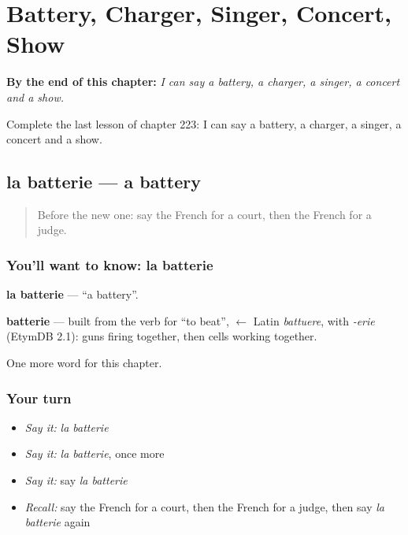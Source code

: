 
\chapter{Battery, Charger, Singer, Concert, Show}
\label{ch:fr-battery-charger-singer-concert-show}

\begin{chapteropening}
\textbf{By the end of this chapter:} \emph{I can say a battery, a charger, a singer, a concert and a show.}

Complete the last lesson of chapter 223: I can say a battery, a charger, a singer, a concert and a show.
\end{chapteropening}

\section[la batterie]{la batterie — a battery}

\label{lesson:FR-C223-batterie}



\begin{quote}
Before the new one: say the French for a court, then the French for a judge.
\end{quote}

\subsection*{You'll want to know: la batterie}
\textbf{la batterie} — \textquotedblleft{}a battery\textquotedblright{}.

\begin{cousinweb}
\textbf{batterie} — built from the verb for \textquotedblleft{}to beat\textquotedblright{}, $\leftarrow$ Latin \emph{battuere}, with \emph{-erie} (EtymDB 2.1): guns firing together, then cells working together.
\end{cousinweb}

\begin{grammarlens}[title={What you've built}]
One more word for this chapter.
\end{grammarlens}

\subsection*{Your turn}
\begin{itemize}
\raggedright
  \item \emph{Say it:} \emph{la batterie}
  \item \emph{Say it:} \emph{la batterie}, once more
  \item \emph{Say it:} say \emph{la batterie}
  \item \emph{Recall:} say the French for a court, then the French for a judge, then say \emph{la batterie} again
\end{itemize}

